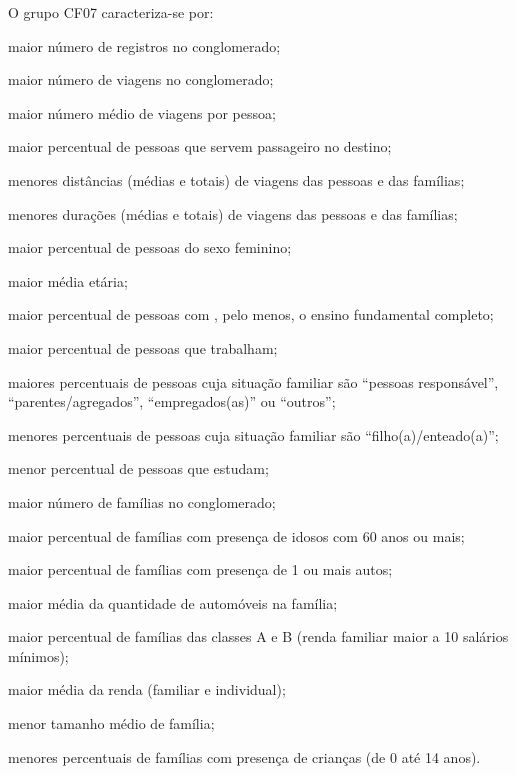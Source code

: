 O grupo CF07 caracteriza-se por:
\begin{compactitem}
\item maior número de registros no conglomerado;
\item maior número de viagens no conglomerado;
\item maior número médio de viagens por pessoa;
\item maior percentual de pessoas que servem passageiro no destino;
\item menores distâncias (médias e totais) de viagens das pessoas e das famílias;
\item menores durações (médias e totais) de viagens das pessoas e das famílias;

\item maior percentual de pessoas do sexo feminino;
\item maior média etária;
\item maior percentual de pessoas com , pelo menos, o ensino fundamental completo;
\item maior percentual de pessoas que trabalham;
\item maiores percentuais de pessoas cuja situação familiar são ``pessoas responsável'', ``parentes/agregados'', ``empregados(as)'' ou  ``outros'';
\item menores percentuais de pessoas cuja situação familiar são ``filho(a)/enteado(a)'';
\item menor percentual de pessoas que estudam;

\item maior número de famílias no conglomerado;
\item maior percentual de famílias com presença de idosos com 60 anos ou mais;
\item maior percentual de famílias com presença de 1 ou mais autos;
\item maior média da quantidade de automóveis na família;
\item maior percentual de famílias das classes A e B (renda familiar maior a 10 salários mínimos);
\item maior média da renda (familiar e individual);
\item menor tamanho médio de família;
\item menores percentuais de famílias com presença de crianças (de 0 até 14 anos).
\end{compactitem}

